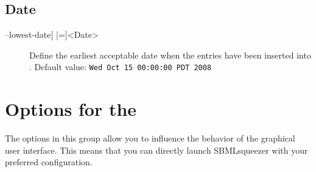 \subsection{Date}
\begin{description}
\item[--lowest-date{[} |={]}<Date>]
  Define the earliest acceptable date when the entries have been
  inserted into \SABIO.
  Default value: \texttt{Wed Oct 15 00:00:00 PDT 2008}
\end{description}


\section{Options for the \GUI}

The options in this group allow you to influence the behavior of the graphical
user interface. This means that you can directly launch SBMLsqueezer with your
preferred configuration.

